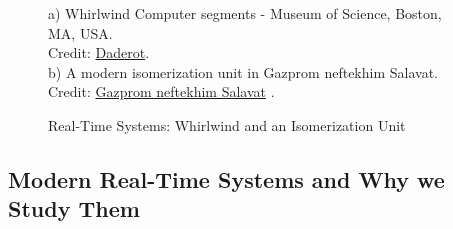 \begin{figure}
    \centering
    \caption{Real-Time Systems: Whirlwind and an Isomerization Unit}
    a) Whirlwind Computer segments - Museum of Science, Boston, MA, USA.\\
    Credit: \href{https://commons.wikimedia.org/wiki/User:Daderot}{Daderot}\cite{daderot_whirlwind_2010}.\\
    b) A modern isomerization unit in Gazprom neftekhim Salavat.\\
    Credit: \href{https://salavat-neftekhim.gazprom.com/press/news/2017/06/36/}{Gazprom neftekhim Salavat} \cite{gazprom_neftekhim_salavat_state---art_2017}.
\end{figure}

\subsection{Modern Real-Time Systems and Why we Study Them}


